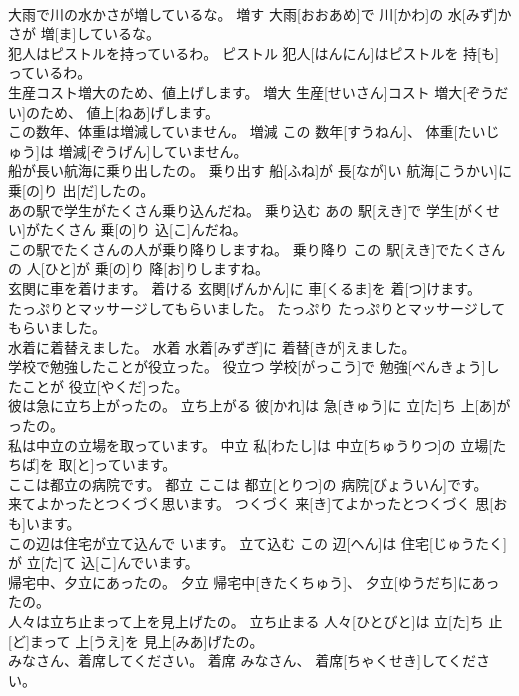 \documentclass[8pt]{extreport}
\begin{document}
\begin{CJK}{UTF8}{min}
\\	大雨で川の水かさが増しているな。	増す	大雨[おおあめ]で 川[かわ]の 水[みず]かさが 増[ま]しているな。	
\\	犯人はピストルを持っているわ。	ピストル	犯人[はんにん]はピストルを 持[も]っているわ。	
\\	生産コスト増大のため、値上げします。	増大	生産[せいさん]コスト 増大[ぞうだい]のため、 値上[ねあ]げします。	
\\	この数年、体重は増減していません。	増減	この 数年[すうねん]、 体重[たいじゅう]は 増減[ぞうげん]していません。	
\\	船が長い航海に乗り出したの。	乗り出す	船[ふね]が 長[なが]い 航海[こうかい]に 乗[の]り 出[だ]したの。	
\\	あの駅で学生がたくさん乗り込んだね。	乗り込む	あの 駅[えき]で 学生[がくせい]がたくさん 乗[の]り 込[こ]んだね。	
\\	この駅でたくさんの人が乗り降りしますね。	乗り降り	この 駅[えき]でたくさんの 人[ひと]が 乗[の]り 降[お]りしますね。	
\\	玄関に車を着けます。	着ける	玄関[げんかん]に 車[くるま]を 着[つ]けます。	
\\	たっぷりとマッサージしてもらいました。	たっぷり	たっぷりとマッサージしてもらいました。	
\\	水着に着替えました。	水着	水着[みずぎ]に 着替[きが]えました。	
\\	学校で勉強したことが役立った。	役立つ	学校[がっこう]で 勉強[べんきょう]したことが 役立[やくだ]った。	
\\	彼は急に立ち上がったの。	立ち上がる	彼[かれ]は 急[きゅう]に 立[た]ち 上[あ]がったの。	
\\	私は中立の立場を取っています。	中立	私[わたし]は 中立[ちゅうりつ]の 立場[たちば]を 取[と]っています。	
\\	ここは都立の病院です。	都立	ここは 都立[とりつ]の 病院[びょういん]です。	
\\	来てよかったとつくづく思います。	つくづく	来[き]てよかったとつくづく 思[おも]います。	
\\	この辺は住宅が立て込んで います。	立て込む	この 辺[へん]は 住宅[じゅうたく]が 立[た]て 込[こ]んでいます。	
\\	帰宅中、夕立にあったの。	夕立	帰宅中[きたくちゅう]、 夕立[ゆうだち]にあったの。	
\\	人々は立ち止まって上を見上げたの。	立ち止まる	人々[ひとびと]は 立[た]ち 止[ど]まって 上[うえ]を 見上[みあ]げたの。	
\\	みなさん、着席してください。	着席	みなさん、 着席[ちゃくせき]してください。	

\end{CJK}
\end{document}
